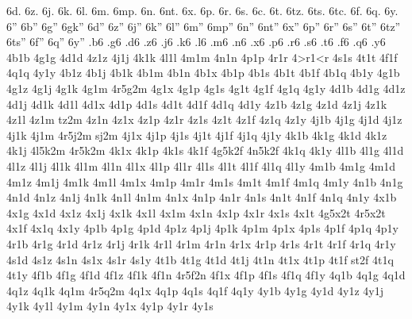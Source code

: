 {6d.
6z.
6j.
6k.
6l.
6m.
6mp.
6n.
6nt.
6x.
6p.
6r.
6s.
6c.
6t.
6tz.
6ts.
6tc.
6f.
6q.
6y.
6''
6b''
6g''
6gk''
6d''
6z''
6j''
6k''
6l''
6m''
6mp''
6n''
6nt''
6x''
6p''
6r''
6s''
6t''
6tz''
6ts''
6f''
6q''
6y''
.b6
.g6
.d6
.z6
.j6
.k6
.l6
.m6
.n6
.x6
.p6
.r6
.s6
.t6
.f6
.q6
.y6
4b1b
4g1g
4d1d
4z1z
4j1j
4k1k
4l1l
4m1m
4n1n
4p1p
4r1r
4>r1<r
4s1s
4t1t
4f1f
4q1q
4y1y
4b1z
4b1j
4b1k
4b1m
4b1n
4b1x
4b1p
4b1s
4b1t
4b1f
4b1q
4b1y
4g1b
4g1z
4g1j
4g1k
4g1m
4r5g2m %
4g1x
4g1p
4g1s
4g1t
4g1f
4g1q
4g1y
4d1b
4d1g
4d1z
4d1j
4d1k
4d1l 
4d1x
4d1p
4d1s
4d1t
4d1f
4d1q
4d1y
4z1b %
4z1g %
4z1d
4z1j
4z1k
4z1l
4z1m
tz2m %
4z1n
4z1x
4z1p
4z1r
4z1s
4z1t
4z1f
4z1q
4z1y
4j1b
4j1g
4j1d
4j1z
4j1k
4j1m
4r5j2m %
sj2m   %
4j1x
4j1p
4j1s
4j1t
4j1f
4j1q
4j1y
4k1b %
4k1g
4k1d
4k1z
4k1j
4l5k2m %
4r5k2m %
4k1x
4k1p
4k1s
4k1f
4g5k2f %
4n5k2f %
4k1q
4k1y
4l1b
4l1g
4l1d
4l1z
4l1j
4l1k
4l1m
4l1n
4l1x
4l1p
4l1r
4l1s
4l1t
4l1f
4l1q
4l1y
4m1b
4m1g
4m1d
4m1z
4m1j
4m1k
4m1l
4m1x
4m1p
4m1r
4m1s
4m1t
4m1f
4m1q
4m1y
4n1b
4n1g
4n1d
4n1z
4n1j
4n1k
4n1l
4n1m
4n1x
4n1p
4n1r
4n1s
4n1t
4n1f
4n1q
4n1y
4x1b
4x1g
4x1d
4x1z
4x1j
4x1k
4x1l
4x1m
4x1n
4x1p
4x1r
4x1s
4x1t
4g5x2t %
4r5x2t %
4x1f
4x1q
4x1y
4p1b
4p1g
4p1d
4p1z
4p1j
4p1k
4p1m
4p1x
4p1s
4p1f
4p1q
4p1y
4r1b
4r1g
4r1d
4r1z
4r1j
4r1k
4r1l
4r1m
4r1n
4r1x
4r1p
4r1s
4r1t
4r1f
4r1q
4r1y
4s1d %
4s1z 
4s1n %
4s1x
4s1r
4s1y
4t1b
4t1g
4t1d
4t1j
4t1n
4t1x
4t1p
4t1f
st2f %
4t1q
4t1y
4f1b
4f1g
4f1d
4f1z
4f1k %
4f1n
4r5f2n %
4f1x
4f1p
4f1s
4f1q
4f1y
4q1b
4q1g
4q1d
4q1z
4q1k
4q1m
4r5q2m %
4q1x
4q1p
4q1s
4q1f
4q1y
4y1b
4y1g
4y1d
4y1z
4y1j
4y1k
4y1l
4y1m
4y1n
4y1x
4y1p
4y1r
4y1s
}
